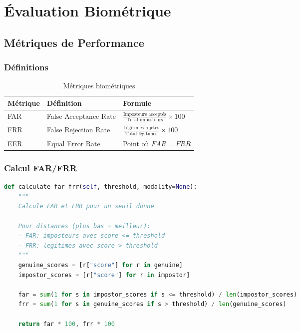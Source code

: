 \documentclass[12pt,a4paper]{report}
\begin{document}
\chapter{Évaluation Biométrique}

\section{Métriques de Performance}

\subsection{Définitions}

\begin{table}[H]
    \centering
    \caption{Métriques biométriques}
    \label{tab:metrics-def}
    \begin{tabular}{|l|p{5cm}|l|}
        \hline
        \textbf{Métrique} & \textbf{Définition} & \textbf{Formule} \\
        \hline
        FAR & False Acceptance Rate & $\frac{\text{Imposteurs acceptés}}{\text{Total imposteurs}} \times 100$ \\
        \hline
        FRR & False Rejection Rate & $\frac{\text{Légitimes rejetés}}{\text{Total légitimes}} \times 100$ \\
        \hline
        EER & Equal Error Rate & Point où $FAR = FRR$ \\
        \hline
    \end{tabular}
\end{table}

\subsection{Calcul FAR/FRR}

\begin{lstlisting}[caption={Calcul des métriques FAR/FRR},language=Python]
def calculate_far_frr(self, threshold, modality=None):
    """
    Calcule FAR et FRR pour un seuil donne
    
    Pour distances (plus bas = meilleur):
    - FAR: imposteurs avec score <= threshold
    - FRR: legitimes avec score > threshold
    """
    genuine_scores = [r["score"] for r in genuine]
    impostor_scores = [r["score"] for r in impostor]
    
    far = sum(1 for s in impostor_scores if s <= threshold) / len(impostor_scores)
    frr = sum(1 for s in genuine_scores if s > threshold) / len(genuine_scores)
    
    return far * 100, frr * 100
\end{lstlisting}
\end{document}
